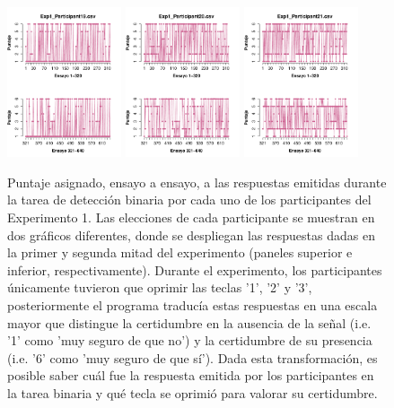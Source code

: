 \begin{figure}[th]
\includegraphics[width=0.30\textwidth]{Figures/Rating_Exp1_P19} \includegraphics[width=0.30\textwidth]{Figures/Rating_Exp1_P20} \includegraphics[width=0.30\textwidth]{Figures/Rating_Exp1_P21}
\caption[Puntajes de Confianza asignados ensayo a ensayo; Experimento 1]{Puntaje asignado, ensayo a ensayo, a las respuestas emitidas durante la tarea de detección binaria por cada uno de los participantes del Experimento 1. Las elecciones de cada participante se muestran en dos gráficos diferentes, donde se despliegan las respuestas dadas en la primer y segunda mitad del experimento (paneles superior e inferior, respectivamente). Durante el experimento, los participantes únicamente tuvieron que oprimir las teclas '1', '2' y '3', posteriormente el programa traducía estas respuestas en una escala mayor que distingue la certidumbre en la ausencia de la señal (i.e. '1' como 'muy seguro de que no') y la certidumbre de su presencia (i.e. '6' como 'muy seguro de que sí'). Dada esta transformación, es posible saber cuál fue la respuesta emitida por los participantes en la tarea binaria y qué tecla se oprimió para valorar su certidumbre.}
\label{fig:Rating_E2}
\end{figure}

